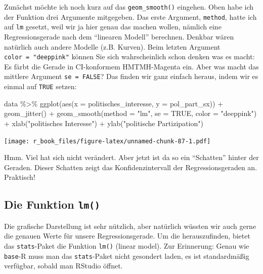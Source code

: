 \documentclass[
]{book}
\newenvironment{Shaded}{\begin{snugshade}}{\end{snugshade}}
\newcommand{\AttributeTok}[1]{\textcolor[rgb]{0.77,0.63,0.00}{#1}}
\newcommand{\ConstantTok}[1]{\textcolor[rgb]{0.00,0.00,0.00}{#1}}
\newcommand{\FunctionTok}[1]{\textcolor[rgb]{0.00,0.00,0.00}{#1}}
\newcommand{\NormalTok}[1]{#1}
\newcommand{\SpecialCharTok}[1]{\textcolor[rgb]{0.00,0.00,0.00}{#1}}
\newcommand{\StringTok}[1]{\textcolor[rgb]{0.31,0.60,0.02}{#1}}
\begin{document}
Zunächst möchte ich noch kurz auf das \texttt{geom\_smooth()} eingehen. Oben habe ich der Funktion drei Argumente mitgegeben. Das erste Argument, \texttt{method}, hatte ich auf \texttt{lm} gesetzt, weil wir ja hier genau das machen wollen, nämlich eine Regressionsgerade nach dem ``linearen Modell'' berechnen. Denkbar wären natürlich auch andere Modelle (z.B. Kurven). Beim letzten Argument \texttt{color\ =\ "deeppink"} können Sie sich wahrscheinlich schon denken was es macht: Es färbt die Gerade in CI-konformem HMTMH-Magenta ein. Aber was macht das mittlere Argument \texttt{se\ =\ FALSE}? Das finden wir ganz einfach heraus, indem wir es einmal auf \texttt{TRUE} setzen:

\begin{Shaded}
\begin{Highlighting}[]
\NormalTok{data }\SpecialCharTok{\%\textgreater{}\%} 
  \FunctionTok{ggplot}\NormalTok{(}\FunctionTok{aes}\NormalTok{(}\AttributeTok{x =}\NormalTok{ politisches\_interesse, }\AttributeTok{y =}\NormalTok{ pol\_part\_sx)) }\SpecialCharTok{+}
  \FunctionTok{geom\_jitter}\NormalTok{() }\SpecialCharTok{+}
  \FunctionTok{geom\_smooth}\NormalTok{(}\AttributeTok{method =} \StringTok{"lm"}\NormalTok{, }\AttributeTok{se =} \ConstantTok{TRUE}\NormalTok{, }\AttributeTok{color =} \StringTok{"deeppink"}\NormalTok{) }\SpecialCharTok{+}
  \FunctionTok{xlab}\NormalTok{(}\StringTok{"politisches Interesse"}\NormalTok{) }\SpecialCharTok{+}
  \FunctionTok{ylab}\NormalTok{(}\StringTok{"politische Partizipation"}\NormalTok{)}
\end{Highlighting}
\end{Shaded}

\texttt{[image: r\_book\_files/figure-latex/unnamed-chunk-87-1.pdf]}

Hmm. Viel hat sich nicht verändert. Aber jetzt ist da so ein ``Schatten'' hinter der Geraden. Dieser Schatten zeigt das Konfidenzintervall der Regressionsgeraden an. Praktisch!

\hypertarget{die-funktion-lm}{%
\subsection{\texorpdfstring{Die Funktion \texttt{lm()}}{Die Funktion lm()}}\label{die-funktion-lm}}

Die grafische Darstellung ist sehr nützlich, aber natürlich wüssten wir auch gerne die genauen Werte für unsere Regressionsgerade. Um die herauszufinden, bietet das \texttt{stats}-Paket die Funktion \texttt{lm()} (linear model). Zur Erinnerung: Genau wie \texttt{base}-R muss man das \texttt{stats}-Paket nicht gesondert laden, es ist standardmäßig verfügbar, sobald man RStudio öffnet.
\end{document}
